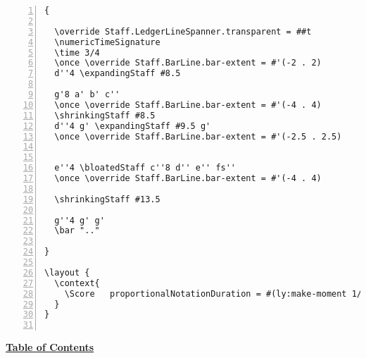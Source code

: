 \begin{Verbatim}[numbers=left,xleftmargin=5mm]
{

  \override Staff.LedgerLineSpanner.transparent = ##t
  \numericTimeSignature
  \time 3/4
  \once \override Staff.BarLine.bar-extent = #'(-2 . 2)
  d''4 \expandingStaff #8.5

  g'8 a' b' c''
  \once \override Staff.BarLine.bar-extent = #'(-4 . 4)
  \shrinkingStaff #8.5
  d''4 g' \expandingStaff #9.5 g'
  \once \override Staff.BarLine.bar-extent = #'(-2.5 . 2.5)


  e''4 \bloatedStaff c''8 d'' e'' fs'' 
  \once \override Staff.BarLine.bar-extent = #'(-4 . 4)

  \shrinkingStaff #13.5

  g''4 g' g'
  \bar ".."

}

\layout {
  \context{
    \Score   proportionalNotationDuration = #(ly:make-moment 1/6)
  }
}


\end{Verbatim}
\hyperref[sec:toc]{\textbf{Table of Contents}}

\vfill \break


